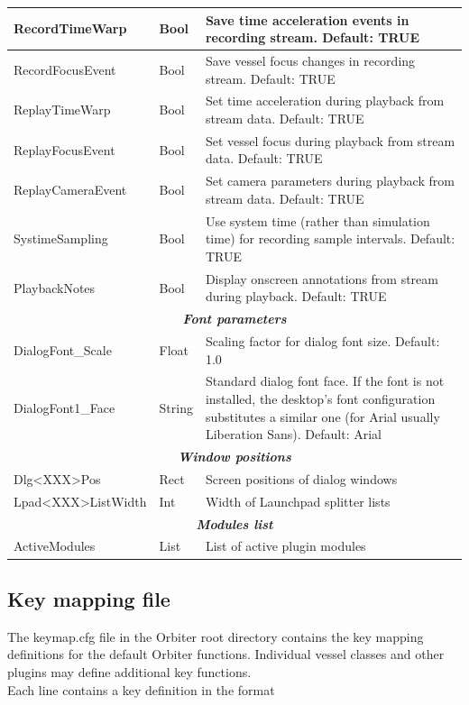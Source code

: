 \documentclass[Orbiter User Manual.tex]{subfiles}
\begin{document}
\begin{longtable}{ |p{}|p{}|p{}| }
	\hline\rule{0pt}{2ex}
	RecordTimeWarp & Bool & Save time acceleration events in recording stream. Default: TRUE\\
	\hline\rule{0pt}{2ex}
	RecordFocusEvent & Bool & Save vessel focus changes in recording stream. Default: TRUE\\
	\hline\rule{0pt}{2ex}
	ReplayTimeWarp & Bool & Set time acceleration during playback from stream data. Default: TRUE\\
	\hline\rule{0pt}{2ex}
	ReplayFocusEvent & Bool & Set vessel focus during playback from stream data. Default: TRUE\\
	\hline\rule{0pt}{2ex}
	ReplayCameraEvent & Bool & Set camera parameters during playback from stream data. Default: TRUE\\
	\hline\rule{0pt}{2ex}
	SystimeSampling & Bool & Use system time (rather than simulation time) for recording sample intervals. Default: TRUE\\
	\hline\rule{0pt}{2ex}
	PlaybackNotes & Bool & Display onscreen annotations from stream during playback. Default: TRUE\\
	\hline
	\multicolumn{3}{|c|}{\rule{0pt}{2ex}\textbf{\textit{Font parameters}}}\\
	\hline\rule{0pt}{2ex}
	DialogFont\_Scale & Float & Scaling factor for dialog font size. Default: 1.0\\
	\hline\rule{0pt}{2ex}
	DialogFont1\_Face & String & Standard dialog font face. If the font is not installed, the desktop's font configuration substitutes a similar one (for Arial usually Liberation Sans). Default: Arial\\
	\hline
	\multicolumn{3}{|c|}{\rule{0pt}{2ex}\textbf{\textit{Window positions}}}\\
	\hline\rule{0pt}{2ex}
	Dlg<XXX>Pos & Rect & Screen positions of dialog windows\\
	\hline\rule{0pt}{2ex}
	Lpad<XXX>ListWidth & Int & Width of Launchpad splitter lists\\
	\hline
	\multicolumn{3}{|c|}{\rule{0pt}{2ex}\textbf{\textit{Modules list}}}\\
	\hline\rule{0pt}{2ex}
	ActiveModules & List & List of active plugin modules\\
	\hline
	\end{longtable}


\subsection{Key mapping file}
The keymap.cfg file in the Orbiter root directory contains the key mapping definitions for the default Orbiter functions. Individual vessel classes and other plugins may define additional key functions.\\
Each line contains a key definition in the format
\end{document}
